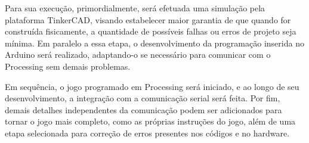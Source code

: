 	Para sua execução, primordialmente, será efetuada uma simulação pela plataforma TinkerCAD, visando estabelecer maior garantia de que quando for construída fisicamente, a quantidade de possíveis falhas ou erros de projeto seja mínima. Em paralelo a essa etapa, o desenvolvimento da programação inserida no Arduino será realizado, adaptando-o se necessário para comunicar com o Processing sem demais problemas.

	Em sequência, o jogo programado em Processing será iniciado, e ao longo de seu desenvolvimento, a integração com a comunicação serial será feita. Por fim, demais detalhes independentes da comunicação podem ser adicionados para tornar o jogo mais completo, como as próprias instruções do jogo, além de uma etapa selecionada para correção de erros presentes nos códigos e no hardware.